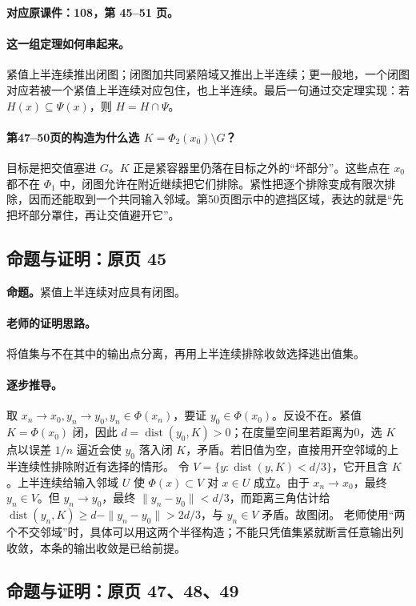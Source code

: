 \documentclass[11pt,a4paper]{article}
\theoremstyle{definition}\newtheorem{definition}{定义}\newtheorem{example}{例}
\begin{document}
\textbf{对应原课件：108，第 45--51 页。}


\paragraph{这一组定理如何串起来。}
紧值上半连续推出闭图；闭图加共同紧陪域又推出上半连续；更一般地，一个闭图对应若被一个紧值上半连续对应包住，也上半连续。最后一句通过交定理实现：若 $H(x)\subseteq\Psi(x)$，则 $H=H\cap\Psi$。

\paragraph{第47--50页的构造为什么选 $K=\Phi_2(x_0)\setminus G$？}
目标是把交值塞进 $G$。$K$ 正是紧容器里仍落在目标之外的“坏部分”。这些点在 $x_0$ 都不在 $\Phi_1$ 中，闭图允许在附近继续把它们排除。紧性把逐个排除变成有限次排除，因而还能取到一个共同输入邻域。第50页图示中的遮挡区域，表达的就是“先把坏部分罩住，再让交值避开它”。


\subsection{命题与证明：原页 45}

\textbf{命题。}紧值上半连续对应具有闭图。

\paragraph{老师的证明思路。}将值集与不在其中的输出点分离，再用上半连续排除收敛选择逃出值集。

\paragraph{逐步推导。}
取 $x_n\to x_0,y_n\to y_0,y_n\in\Phi(x_n)$，要证 $y_0\in\Phi(x_0)$。反设不在。紧值 $K=\Phi(x_0)$ 闭，因此 $d=\operatorname{dist}(y_0,K)>0$；在度量空间里若距离为0，选 $K$ 点以误差 $1/n$ 逼近会使 $y_0$ 落入闭 $K$，矛盾。若旧值为空，直接用开空邻域的上半连续性排除附近有选择的情形。
令 $V=\{y:\operatorname{dist}(y,K)<d/3\}$，它开且含 $K$。上半连续给输入邻域 $U$ 使 $\Phi(x)\subset V$ 对 $x\in U$ 成立。由于 $x_n\to x_0$，最终 $y_n\in V$。但 $y_n\to y_0$，最终 $\|y_n-y_0\|<d/3$，而距离三角估计给 $\operatorname{dist}(y_n,K)\ge d-\|y_n-y_0\|>2d/3$，与 $y_n\in V$ 矛盾。故图闭。
老师使用“两个不交邻域”时，具体可以用这两个半径构造；不能只凭值集紧就断言任意输出列收敛，本条的输出收敛是已给前提。


\subsection{命题与证明：原页 47、48、49}
\end{document}
